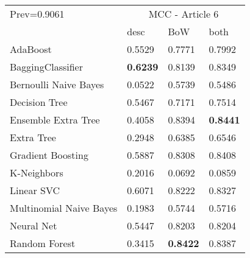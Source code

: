 \begin{tabular}{|l|l|l|l| }
\hline
Prev=0.9061 &  \multicolumn{3}{c|}{MCC - Article 6} \\
\cline{2-4} & desc & BoW & both \\ \hline
AdaBoost                & 0.5529 & 0.7771 & 0.7992\\
BaggingClassifier       & {\bf 0.6239} & 0.8139 & 0.8349\\
Bernoulli Naive Bayes   & 0.0522 & 0.5739 & 0.5486\\
Decision Tree           & 0.5467 & 0.7171 & 0.7514\\
Ensemble Extra Tree     & 0.4058 & 0.8394 & {\bf 0.8441}\\
Extra Tree              & 0.2948 & 0.6385 & 0.6546\\
Gradient Boosting       & 0.5887 & 0.8308 & 0.8408\\
K-Neighbors             & 0.2016 & 0.0692 & 0.0859\\
Linear SVC              & 0.6071 & 0.8222 & 0.8327\\
Multinomial Naive Bayes & 0.1983 & 0.5744 & 0.5716\\
Neural Net              & 0.5447 & 0.8203 & 0.8204\\
Random Forest           & 0.3415 & {\bf 0.8422} & 0.8387\\
\hline
\end{tabular}